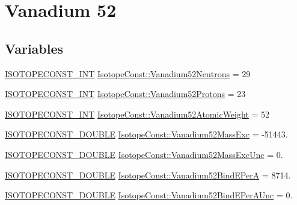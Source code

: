 \hypertarget{group___isotope_const-_vanadium-_v52}{}\section{Vanadium 52}
\label{group___isotope_const-_vanadium-_v52}
\subsection*{Variables}
\begin{DoxyCompactItemize}
\item 
\mbox{\hyperlink{group___isotope_const-_macros_ga5f18360b3e99483a35c32d789e62621c}{I\+S\+O\+T\+O\+P\+E\+C\+O\+N\+S\+T\+\_\+\+I\+NT}} \mbox{\hyperlink{group___isotope_const-_vanadium-_v52_ga45a8ef45de24e28185d0b4cbce5d3a97}{Isotope\+Const\+::\+Vanadium52\+Neutrons}} = 29
\item 
\mbox{\hyperlink{group___isotope_const-_macros_ga5f18360b3e99483a35c32d789e62621c}{I\+S\+O\+T\+O\+P\+E\+C\+O\+N\+S\+T\+\_\+\+I\+NT}} \mbox{\hyperlink{group___isotope_const-_vanadium-_v52_gadf8ec3688cdda9a07f1094357a00131d}{Isotope\+Const\+::\+Vanadium52\+Protons}} = 23
\item 
\mbox{\hyperlink{group___isotope_const-_macros_ga5f18360b3e99483a35c32d789e62621c}{I\+S\+O\+T\+O\+P\+E\+C\+O\+N\+S\+T\+\_\+\+I\+NT}} \mbox{\hyperlink{group___isotope_const-_vanadium-_v52_ga7105dbdd799b10747ccf11c1ad94f42b}{Isotope\+Const\+::\+Vanadium52\+Atomic\+Weight}} = 52
\item 
\mbox{\hyperlink{group___isotope_const-_macros_ga8f45a7272ce02c0b4c65c44636ed719a}{I\+S\+O\+T\+O\+P\+E\+C\+O\+N\+S\+T\+\_\+\+D\+O\+U\+B\+LE}} \mbox{\hyperlink{group___isotope_const-_vanadium-_v52_ga317e34e3a7f58ffeb29ca8d3dbeb00c0}{Isotope\+Const\+::\+Vanadium52\+Mass\+Exc}} = -\/51443.
\item 
\mbox{\hyperlink{group___isotope_const-_macros_ga8f45a7272ce02c0b4c65c44636ed719a}{I\+S\+O\+T\+O\+P\+E\+C\+O\+N\+S\+T\+\_\+\+D\+O\+U\+B\+LE}} \mbox{\hyperlink{group___isotope_const-_vanadium-_v52_ga9e595c50c8e59078bf4c09b896ab84cf}{Isotope\+Const\+::\+Vanadium52\+Mass\+Exc\+Unc}} = 0.
\item 
\mbox{\hyperlink{group___isotope_const-_macros_ga8f45a7272ce02c0b4c65c44636ed719a}{I\+S\+O\+T\+O\+P\+E\+C\+O\+N\+S\+T\+\_\+\+D\+O\+U\+B\+LE}} \mbox{\hyperlink{group___isotope_const-_vanadium-_v52_ga8cff4699162e28c3e072249aa76deb6d}{Isotope\+Const\+::\+Vanadium52\+Bind\+E\+PerA}} = 8714.
\item 
\mbox{\hyperlink{group___isotope_const-_macros_ga8f45a7272ce02c0b4c65c44636ed719a}{I\+S\+O\+T\+O\+P\+E\+C\+O\+N\+S\+T\+\_\+\+D\+O\+U\+B\+LE}} \mbox{\hyperlink{group___isotope_const-_vanadium-_v52_ga7f4d59f5fd41341620b4e774701d8950}{Isotope\+Const\+::\+Vanadium52\+Bind\+E\+Per\+A\+Unc}} = 0.

\end{DoxyCompactItemize}
